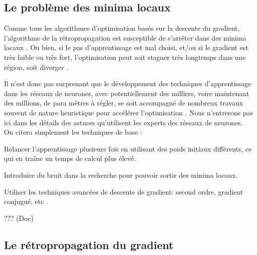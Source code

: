 	
	

	\subsection{Le problème des minima locaux} 
	
	Comme tous les algorithmes d'optimisation basés sur la descente du gradient, l'algorithme de la rétropropagation est susceptible de s'arrêter dans des minima locaux \cite{bosman2020visualising}. Ou bien, si le pas d'apprentissage est mal choisi, et/ou si le gradient est très faible ou très fort, l'optimisation peut soit stagner très longtemps dans une région, soit diverger \cite{antoine2018apprentissage,ml2008python}.
	
	Il n'est donc pas surprenant que le développement des techniques d'apprentissage dans les réseaux de neurones, avec potentiellement des milliers, voire maintenant des millions, de para mètres à régler, se soit accompagné de nombreux travaux souvent de nature heuristique pour accélérer l'optimisation \cite{antoine2018apprentissage}. Nous n'entrerons pas ici dans les détails des astuces qu'utilisent les experts des réseaux de neurones. On citera simplement les techniques de base :
	
	\begin{list}{--}{}
		\item Relancer l'apprentissage plusieurs fois en utilisant des poids initiaux différents, ce qui en traîne un temps de calcul plus élevé.
		\item Introduire du bruit dans la recherche pour pouvoir sortir des minima locaux.
	\end{list}

	Utiliser les techniques avancées de descente de gradient: second ordre, gradient conjugué, etc \cite{bottou2018optimization, antoine2018apprentissage}.
	
	??? (Doc)
	
	
	
	
	
	
	
	
	
	\subsection{Le rétropropagation du gradient}\label{sec:backprop}
	
